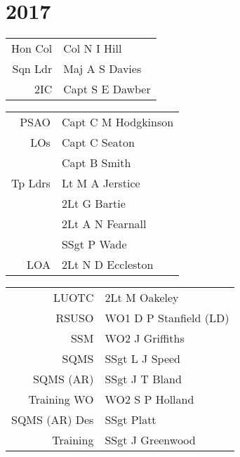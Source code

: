 \chapter*{2017}

\vspace*{10mm}

\begin{center}
  \begin{tabular}{rl}
    Hon Col & Col N I Hill \\
    Sqn Ldr & Maj A S Davies \\
    2IC & Capt S E Dawber \\
  \end{tabular}
\end{center}

\begin{multicols}{2}
  \small
  \begin{tabular}{rl}
    PSAO & Capt C M Hodgkinson \\
    LOs & Capt C Seaton \\
        & Capt B Smith \\
    Tp Ldrs & Lt M A Jerstice \\
     & 2Lt G Bartie \\
     & 2Lt A N Fearnall \\
     & SSgt P Wade \\
    LOA & 2Lt N D Eccleston \\
  \end{tabular}

  \begin{tabular}{rl}
    LUOTC & 2Lt M Oakeley \\
    RSUSO & WO1 D P Stanfield (LD) \\
    SSM & WO2 J Griffiths \\
    SQMS & SSgt L J Speed \\
    SQMS (AR) & SSgt J T Bland \\
    Training WO & WO2 S P Holland \\
    SQMS (AR) Des & SSgt Platt \\
    Training & SSgt J Greenwood \\
  \end{tabular}
\end{multicols}

